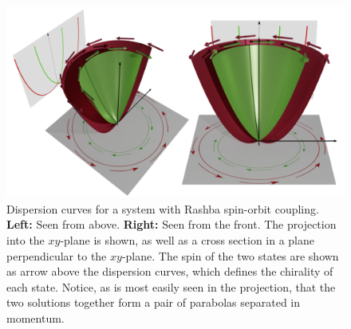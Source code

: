 \begin{figure}[hp]
  \centering
  \includegraphics[width=\textwidth]{figures/rashba_combine-wside-small.png}
  \caption{Dispersion curves for a system with Rashba spin-orbit coupling. \textbf{Left:} Seen from above. \textbf{Right:} Seen from the front.
    The projection into the $xy$-plane is shown, as well as a cross section in a plane perpendicular to the $xy$-plane.
    The spin of the two states are shown as arrow above the dispersion curves, which defines the chirality of each state.
    Notice, as is most easily seen in the projection, that the two solutions together form a pair of parabolas separated in momentum.
  }
  \label{fig:rashba}
\end{figure}

        


